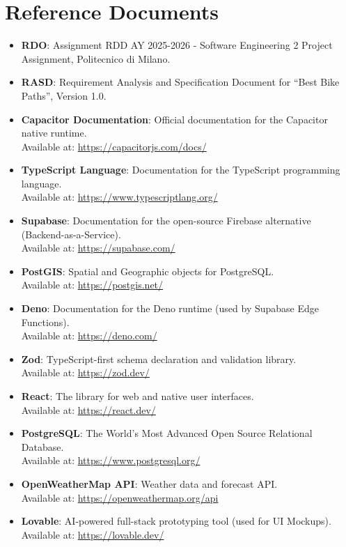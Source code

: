 \section{Reference Documents}
\begin{itemize}
    \item \textbf{RDO}: Assignment RDD AY 2025-2026 - Software Engineering 2 Project Assignment, Politecnico di Milano.

    \item \textbf{RASD}: Requirement Analysis and Specification Document for ``Best Bike Paths'', Version 1.0.
        
    \item \textbf{Capacitor Documentation}: Official documentation for the Capacitor native runtime. \\
    Available at: \url{https://capacitorjs.com/docs/}
    
    \item \textbf{TypeScript Language}: Documentation for the TypeScript programming language. \\
    Available at: \url{https://www.typescriptlang.org/}
    
    \item \textbf{Supabase}: Documentation for the open-source Firebase alternative (Backend-as-a-Service). \\
    Available at: \url{https://supabase.com/}
    
    \item \textbf{PostGIS}: Spatial and Geographic objects for PostgreSQL. \\
    Available at: \url{https://postgis.net/}
    
    \item \textbf{Deno}: Documentation for the Deno runtime (used by Supabase Edge Functions). \\
    Available at: \url{https://deno.com/}
    
    \item \textbf{Zod}: TypeScript-first schema declaration and validation library. \\
    Available at: \url{https://zod.dev/}

    \item \textbf{React}: The library for web and native user interfaces. \\
    Available at: \url{https://react.dev/}

    \item \textbf{PostgreSQL}: The World's Most Advanced Open Source Relational Database. \\
    Available at: \url{https://www.postgresql.org/}

    \item \textbf{OpenWeatherMap API}: Weather data and forecast API. \\
    Available at: \url{https://openweathermap.org/api}

    \item \textbf{Lovable}: AI-powered full-stack prototyping tool (used for UI Mockups). \\
    Available at: \url{https://lovable.dev/}
\end{itemize}

